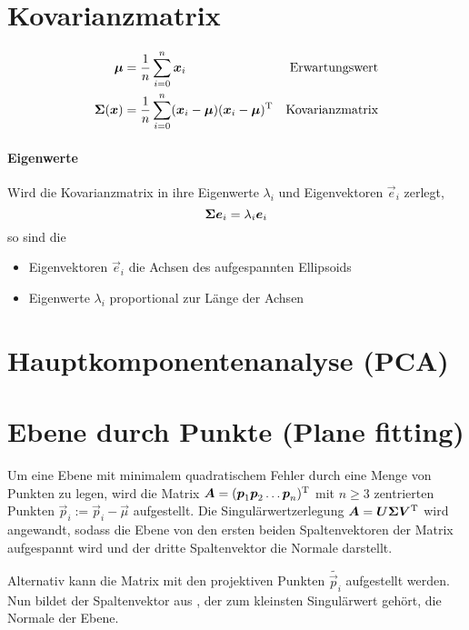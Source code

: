 \documentclass[a4paper]{scrartcl}
\begin{document}
\section{Kovarianzmatrix}
\begin{align*}
  \mbox{\boldmath$\mu$} &= \frac{1}{n} \sum_{i=0}^n \mbox{\boldmath$x$}_i   & \textnormal{Erwartungswert}
\\
  \mbox{\boldmath$\Sigma$}(\mbox{\boldmath$x$}) &= \frac{1}{n} \sum_{i=0}^n (\mbox{\boldmath$x$}_i-\mbox{\boldmath$\mu$}){(\mbox{\boldmath$x$}_i-\mbox{\boldmath$\mu$})}\textsuperscript{T}
  & \textnormal{Kovarianzmatrix}
\end{align*}

\paragraph{Eigenwerte}

Wird die Kovarianzmatrix in ihre Eigenwerte $\lambda_i$ und Eigenvektoren $\vec{e}_i$ zerlegt,
\[
  \mbox{\boldmath$\Sigma$} \mbox{\boldmath$e$}_i = \lambda_i \mbox{\boldmath$e$}_i
\]
so sind die
\begin{itemize}
  \item Eigenvektoren $\vec{e}_i$ die Achsen des aufgespannten Ellipsoids
  \item Eigenwerte $\lambda_i$ proportional zur Länge der Achsen
\end{itemize}

\section{Hauptkomponentenanalyse (PCA)}

\section{Ebene durch Punkte (Plane fitting)}

Um eine Ebene mit minimalem quadratischem Fehler durch eine Menge von Punkten zu legen, wird die Matrix $ \mbox{\boldmath$A$} = {(\mbox{\boldmath$p$}_1 \mbox{\boldmath$p$}_2 \ldots \mbox{\boldmath$p$}_n)}\textsuperscript{T}$ mit $n \geq 3$ zentrierten Punkten $\vec{p}_i := \vec{p}_i - \vec{\mu}$ aufgestellt. 
Die Singulärwertzerlegung $\mbox{\boldmath$A$} = \mbox{\boldmath$U$} \mbox{\boldmath$\Sigma$} {\mbox{\boldmath$V$}}\textsuperscript{T}$ wird angewandt, sodass die Ebene von den ersten beiden Spaltenvektoren der Matrix  aufgespannt wird und der dritte Spaltenvektor die Normale darstellt.

Alternativ kann die Matrix  mit den projektiven Punkten $\tilde{\vec{p}_i}$ aufgestellt werden. Nun bildet der Spaltenvektor aus , der zum kleinsten Singulärwert gehört, die Normale der Ebene.
\end{document}
